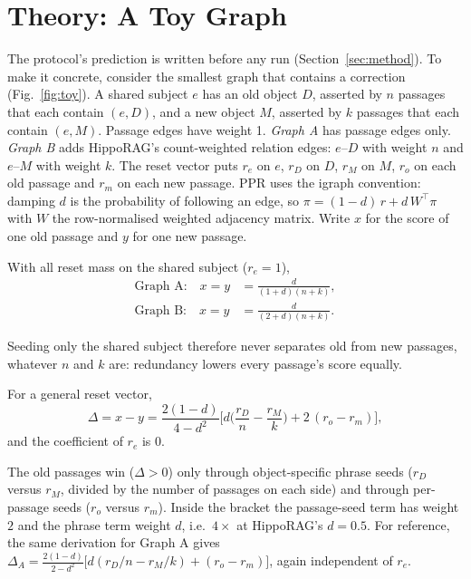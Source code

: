 \section{Theory: A Toy Graph}\label{sec:theory}

The protocol's prediction is written before any run (Section~\ref{sec:method}). To make it concrete, consider the
smallest graph that contains a correction (Fig.~\ref{fig:toy}). A shared subject $e$ has an old object $D$, asserted
by $n$ passages that each contain $(e, D)$, and a new object $M$, asserted by $k$ passages that each contain $(e, M)$.
Passage edges have weight 1. \emph{Graph A} has passage edges only. \emph{Graph B} adds HippoRAG's count-weighted
relation edges: $e$--$D$ with weight $n$ and $e$--$M$ with weight $k$. The reset vector puts $r_e$ on $e$, $r_D$ on $D$,
$r_M$ on $M$, $r_o$ on each old passage and $r_m$ on each new passage. PPR uses the igraph convention: damping $d$ is the
probability of following an edge, so $\pi = (1-d)\,r + d\,W^\top \pi$ with $W$ the row-normalised weighted adjacency
matrix. Write $x$ for the score of one old passage and $y$ for one new passage.

\begin{proposition}\label{prop:shared}
With all reset mass on the shared subject ($r_e = 1$),
\begin{align}
\text{Graph A:}\quad x = y &= \frac{d}{(1+d)(n+k)},\\
\text{Graph B:}\quad x = y &= \frac{d}{(2+d)(n+k)}.
\end{align}
\end{proposition}
Seeding only the shared subject therefore never separates old from new passages, whatever $n$ and $k$ are: redundancy
lowers every passage's score equally.

\begin{proposition}\label{prop:margin}
For a general reset vector,
\begin{equation}
\Delta = x - y = \frac{2(1-d)}{4-d^2}\Big[d\Big(\frac{r_D}{n} - \frac{r_M}{k}\Big) + 2\,(r_o - r_m)\Big],
\label{eq:margin}
\end{equation}
and the coefficient of $r_e$ is $0$.
\end{proposition}
The old passages win ($\Delta > 0$) only through object-specific phrase seeds ($r_D$ versus $r_M$, divided by the number
of passages on each side) and through per-passage seeds ($r_o$ versus $r_m$). Inside the bracket the passage-seed term
has weight $2$ and the phrase term weight $d$, i.e.\ $4\times$ at HippoRAG's $d = 0.5$. For reference, the same derivation for
Graph A gives $\Delta_A = \frac{2(1-d)}{2-d^2}\big[d(r_D/n - r_M/k) + (r_o - r_m)\big]$, again independent of $r_e$.

